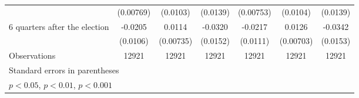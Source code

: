 \begin{table}[htbp]
\begin{tabular}{l*{6}{c}}
                    &   (0.00769)         &    (0.0103)         &    (0.0139)         &   (0.00753)         &    (0.0104)         &    (0.0139)         \\
[1em]
 6 quarters after the election&     -0.0205         &      0.0114         &     -0.0320\sym{*}  &     -0.0217         &      0.0126         &     -0.0342\sym{*}  \\
                    &    (0.0106)         &   (0.00735)         &    (0.0152)         &    (0.0111)         &   (0.00703)         &    (0.0153)         \\
\hline
Observations        &       12921         &       12921         &       12921         &       12921         &       12921         &       12921         \\
\hline\hline
\multicolumn{7}{l}{\footnotesize Standard errors in parentheses}\\
\multicolumn{7}{l}{\footnotesize \sym{*} \(p<0.05\), \sym{**} \(p<0.01\), \sym{***} \(p<0.001\)}\\
\end{tabular}
\end{table}
